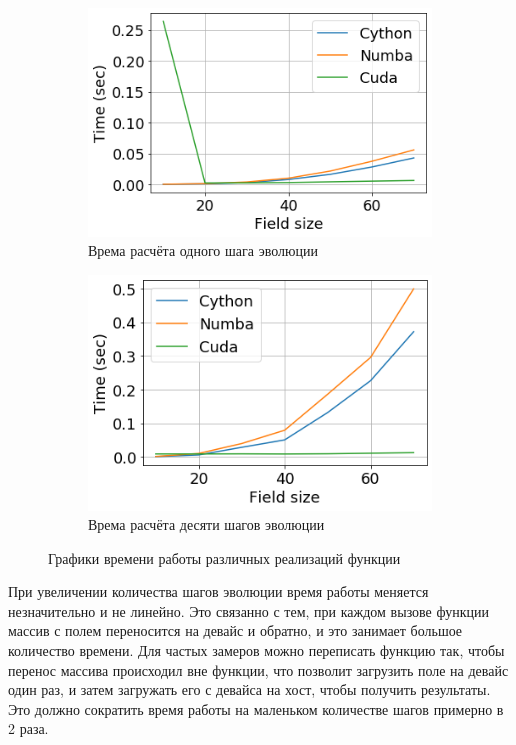 \documentclass[a4paper,12pt]{article}
\begin{document}
\begin{figure}[H]
	\centering
	\begin{subfigure}[b]{0.45\textwidth}
		\includegraphics[width = \textwidth]{Images/1_step_time_with_cuda.png}
		\caption{Врема расчёта одного шага эволюции} 
	\end{subfigure}
	\hfill
	\begin{subfigure}[b]{0.45\textwidth}
		\includegraphics[width = \textwidth]{Images/10_step_time_with_cuda.png} 
		\caption{Врема расчёта десяти шагов эволюции} 
	\end{subfigure}
	\caption{Графики времени работы различных реализаций функции}
\end{figure}

При увеличении количества шагов эволюции время работы меняется незначительно и не линейно. Это связанно с тем, при каждом вызове функции массив с полем переносится на девайс и обратно, и это занимает большое количество времени. Для частых замеров можно переписать функцию так, чтобы перенос массива происходил вне функции, что позволит загрузить поле на девайс один раз, и затем загружать его с девайса на хост, чтобы получить результаты. Это должно сократить время работы на маленьком количестве шагов примерно в 2 раза.
\end{document}
